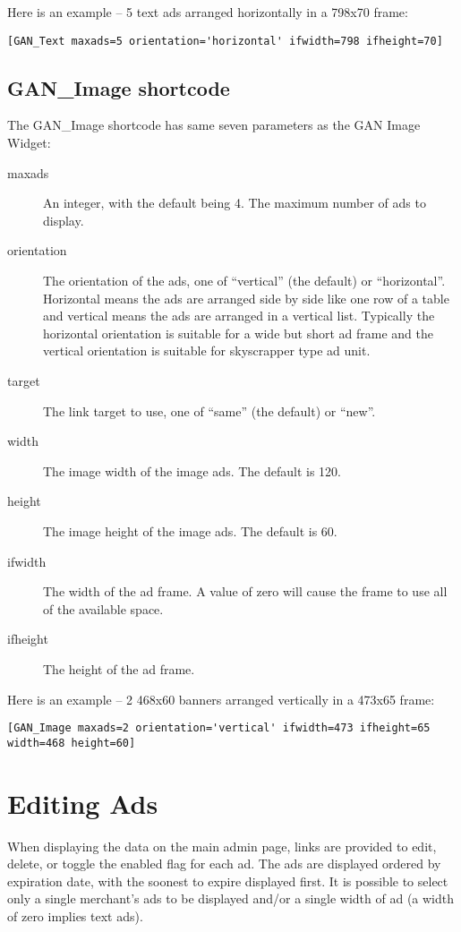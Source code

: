 \documentclass[letterpaper]{article}
\begin{document}
Here is an example -- 5 text ads arranged horizontally in a 798x70 frame:
\begin{verbatim}
[GAN_Text maxads=5 orientation='horizontal' ifwidth=798 ifheight=70]
\end{verbatim}

\subsection{GAN\_Image shortcode}

The GAN\_Image shortcode has same seven parameters as the GAN Image
Widget:
\begin{description}
  \item[maxads] An integer, with the default being 4.
The maximum number of ads to display.
  \item[orientation] The orientation of the ads, one of
``vertical'' (the default) or ``horizontal''. Horizontal means the ads are
arranged side by side like one row of a table and      vertical means
the ads are arranged in a vertical list. Typically the horizontal
orientation is suitable for a wide but short ad frame and the vertical
orientation is suitable for skyscrapper type ad unit.
  \item[target] The link target to use, one of ``same'' (the
default) or ``new''.
  \item[width] The image width of the image ads. The
default is 120.
  \item[height] The image height of the image ads. The
default is 60.
  \item[ifwidth] The width of the ad frame. A value
of zero will cause the frame to use all of the available space.
  \item[ifheight] The height of the ad frame.
\end{description}

Here is an example -- 2 468x60 banners arranged vertically in a 473x65 frame:
\begin{verbatim}
[GAN_Image maxads=2 orientation='vertical' ifwidth=473 ifheight=65 width=468 height=60]
\end{verbatim}

\section{Editing Ads}

When displaying the data on the main admin page, links are provided
to edit, delete, or toggle the enabled flag for each ad. The ads are
displayed ordered by expiration date, with the soonest to expire
displayed first. It is possible to select only a single merchant's ads
to be displayed and/or a single width of ad (a width of zero implies
text ads).
\end{document}
